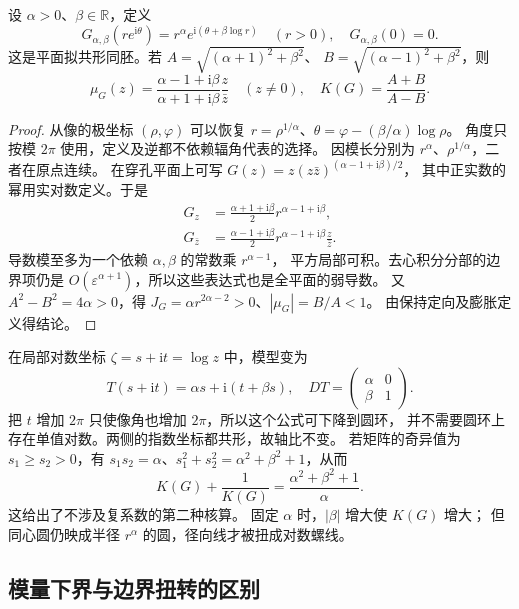 \begin{proposition}[带旋转的径向模型]\label{b3:prop:B-spiral-stretch}
设 \(\alpha>0\)、\(\beta\in\mathbb R\)，定义
\[
 G_{\alpha,\beta}(re^{\mathrm i\theta})
 =r^\alpha e^{\mathrm i(\theta+\beta\log r)}\quad(r>0),
 \quad G_{\alpha,\beta}(0)=0.
\]
这是平面拟共形同胚。若
\(A=\sqrt{(\alpha+1)^2+\beta^2}\)、
\(B=\sqrt{(\alpha-1)^2+\beta^2}\)，则
\[
 \mu_G(z)=\frac{\alpha-1+\mathrm i\beta}{\alpha+1+\mathrm i\beta}
                  \frac z{\bar z}\quad(z\ne0),
 \quad K(G)=\frac{A+B}{A-B}.
\]
\end{proposition}
\begin{proof}
从像的极坐标 \((\rho,\varphi)\) 可以恢复
\(r=\rho^{1/\alpha}\)、\(\theta=\varphi-(\beta/\alpha)\log\rho\)。
角度只按模 \(2\pi\) 使用，定义及逆都不依赖辐角代表的选择。
因模长分别为 \(r^\alpha\)、\(\rho^{1/\alpha}\)，二者在原点连续。
在穿孔平面上可写
\(G(z)=z(z\bar z)^{(\alpha-1+\mathrm i\beta)/2}\)，
其中正实数的幂用实对数定义。于是
\[
 \begin{aligned}
 G_z&=\frac{\alpha+1+\mathrm i\beta}{2}r^{\alpha-1+\mathrm i\beta},\\
 G_{\bar z}&=\frac{\alpha-1+\mathrm i\beta}{2}
                  r^{\alpha-1+\mathrm i\beta}\frac z{\bar z}.
 \end{aligned}
\]
导数模至多为一个依赖 \(\alpha,\beta\) 的常数乘 \(r^{\alpha-1}\)，
平方局部可积。去心积分分部的边界项仍是
\(O(\varepsilon^{\alpha+1})\)，所以这些表达式也是全平面的弱导数。
又 \(A^2-B^2=4\alpha>0\)，得
\(J_G=\alpha r^{2\alpha-2}>0\)、\(|\mu_G|=B/A<1\)。
由保持定向及膨胀定义得结论。
\end{proof}
在局部对数坐标 \(\zeta=s+\mathrm i t=\log z\) 中，模型变为
\[
 T(s+\mathrm i t)=\alpha s+\mathrm i(t+\beta s),
 \quad DT=\begin{pmatrix}\alpha&0\\ \beta&1\end{pmatrix}.
\]
把 \(t\) 增加 \(2\pi\) 只使像角也增加 \(2\pi\)，所以这个公式可下降到圆环，
并不需要圆环上存在单值对数。两侧的指数坐标都共形，故轴比不变。
若矩阵的奇异值为 \(s_1\ge s_2>0\)，有
\(s_1s_2=\alpha\)、\(s_1^2+s_2^2=\alpha^2+\beta^2+1\)，从而
\begin{equation}\label{b3:eq:B-spiral-ratio}
 K(G)+\frac1{K(G)}=\frac{\alpha^2+\beta^2+1}{\alpha}.
\end{equation}
这给出了不涉及复系数的第二种核算。
固定 \(\alpha\) 时，\(|\beta|\) 增大使 \(K(G)\) 增大；
但同心圆仍映成半径 \(r^\alpha\) 的圆，径向线才被扭成对数螺线。

\subsection{模量下界与边界扭转的区别}
\label{b3:subsec:B0304}


